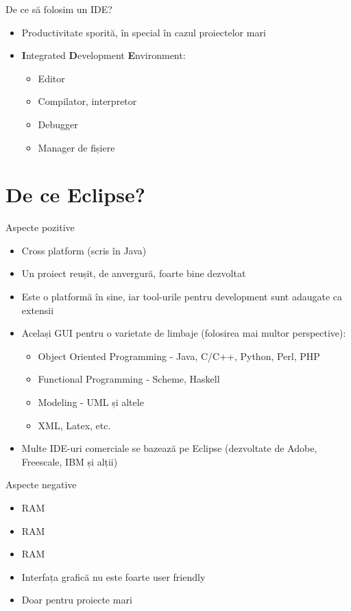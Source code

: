 \documentclass{beamer}
\begin{document}
\begin{frame}{De ce să folosim un IDE?}
  \begin{itemize}
  \pause
  \item Productivitate sporită, în special în cazul proiectelor mari
  \pause
  \item \textbf{I}ntegrated \textbf{D}evelopment \textbf{E}nvironment:
		\begin{itemize} 
		\pause
	  \item Editor
  	\pause
	  \item Compilator, interpretor
  	\pause
	  \item Debugger
		\pause
	  \item Manager de fișiere
  	\end{itemize}
  \end{itemize}
\end{frame}

\section{De ce Eclipse?}

\begin{frame}{Aspecte pozitive}
  \begin{itemize}
  \pause
  \item Cross platform (scris în Java)
  \pause
  \item Un proiect reușit, de anvergură, foarte bine dezvoltat
  \pause 
  \item Este o platformă în sine, iar tool-urile pentru development sunt adaugate ca extensii
  \pause
  \item Același GUI pentru o varietate de limbaje (folosirea mai multor perspective):
    \begin{itemize} 
      \pause
      \item Object Oriented Programming - Java, C/C++, Python, Perl, PHP
      \pause
      \item Functional Programming -  Scheme, Haskell
      \pause
      \item Modeling - UML și altele
      \pause
      \item XML, Latex, etc.
      \pause
    \end{itemize}
  \item Multe IDE-uri comerciale se bazează pe Eclipse (dezvoltate de Adobe, Freescale, IBM și alții)
\end{itemize}
\end{frame}

\begin{frame}{Aspecte negative}
  \begin{itemize}
  \pause
  \item RAM
  \pause
  \item RAM
  \pause
  \item RAM
  \pause
  \item Interfața grafică nu este foarte user friendly 
  \pause 
  \item Doar pentru proiecte mari
  \pause
\end{itemize}    
\end{frame}
\end{document}
